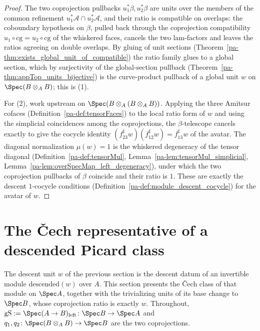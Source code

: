 \begin{proof}
  \leanok
  The two coprojection pullbacks \(u_1^{*}\beta, u_2^{*}\beta\) are units over the members of
  the common refinement \(u_1^{*}\mathcal A \cap u_2^{*}\mathcal A\), and their ratio is
  compatible on overlaps: the coboundary hypothesis on \(\beta\), pulled back through the
  coprojection compatibility \(u_1 \circ \mathrm{cg} = u_2 \circ \mathrm{cg}\) of the whiskered
  faces, cancels the two \(\mathrm{lam}\)-factors and leaves the ratios agreeing on double
  overlaps.  By gluing of unit sections (Theorem~\ref{pa-thm:exists_global_unit_of_compatible})
  the ratio family glues to a global section, which by surjectivity of the global-section
  pullback (Theorem~\ref{pa-thm:appTop_units_bijective}) is the curve-product pullback of a global
  unit \(w\) on \(\Spec(B \otimes_A B)\); this is (1).

  For (2), work upstream on \(\Spec(B \otimes_A (B \otimes_A B))\).  Applying the three Amitsur
  cofaces (Definition~\ref{pa-def:tensorFaces}) to the local ratio form of \(w\) and using the
  simplicial coincidences among the coprojections, the \(\beta\)-telescope cancels exactly to
  give the cocycle identity \((f_{23}^{\sharp} w)(f_{12}^{\sharp} w) = f_{13}^{\sharp} w\) of the
  avatar.  The diagonal normalization \(\mu(w) = 1\) is the whiskered degeneracy of the tensor
  diagonal (Definition~\ref{pa-def:tensorMul}, Lemma~\ref{pa-lem:tensorMul_simplicial},
  Lemma~\ref{pa-lem:overSpecMap_left_degeneracy}), under which the two coprojection pullbacks of
  \(\beta\) coincide and their ratio is \(1\).  These are exactly the descent \(1\)-cocycle
  conditions (Definition~\ref{pa-def:module_descent_cocycle}) for the avatar of \(w\).
\end{proof}

\section{The \v Cech representative of a descended Picard class}
\label{pa-sec:descentClassRep}

The descent unit \(w\) of the previous section is the descent datum of an invertible module
\(\mathrm{descended}(w)\) over \(A\).  This section presents the \v Cech class of that module on
\(\Spec A\), together with the trivializing units of its base change to \(\Spec B\), whose
coprojection ratio is exactly \(w\).  Throughout, \(\mathrm{gS} := \Spec(A \to B)_{\mathrm{left}}
\colon \Spec B \to \Spec A\) and \(q_1, q_2 \colon \Spec(B \otimes_A B) \to \Spec B\) are the two
coprojections.

